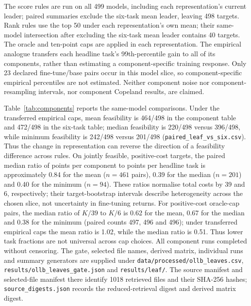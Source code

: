 \documentclass{article}
\begin{document}
The score rules are run on all 499 models, including each representation's current leader; paired summaries exclude the six-task mean leader, leaving 498 targets. Rank rules use the top 50 under each representation's own mean; their same-model intersection after excluding the six-task mean leader contains 40 targets. The oracle and ten-point caps are applied in each representation. The empirical analogue transfers each headline task's 99th-percentile gain to all of its components, rather than estimating a component-specific training response. Only 23 declared fine-tune/base pairs occur in this model slice, so component-specific empirical percentiles are not estimated. Neither component noise nor component-resampling intervals, nor component Copeland results, are claimed.

Table~\ref{tab:components} reports the same-model comparisons. Under the transferred empirical caps, mean feasibility is 464/498 in the component table and 472/498 in the six-task table; median feasibility is 220/498 versus 396/498, while minimum feasibility is 242/498 versus 201/498 (\texttt{paired\_leaf\_vs\_six.csv}). Thus the change in representation can reverse the direction of a feasibility difference across rules. On jointly feasible, positive-cost targets, the paired median ratio of points per component to points per headline task is approximately 0.84 for the mean ($n=461$ pairs), 0.39 for the median ($n=201$) and 0.40 for the minimum ($n=94$). These ratios normalise total costs by 39 and 6, respectively; their target-bootstrap intervals describe heterogeneity across the chosen slice, not uncertainty in fine-tuning returns. For positive-cost oracle-cap pairs, the median ratio of $K/39$ to $K/6$ is 0.62 for the mean, 0.67 for the median and 0.38 for the minimum (paired counts 497, 496 and 496); under transferred empirical caps the mean ratio is 1.02, while the median ratio is 0.51. Thus lower task fractions are not universal across cap choices. All component runs completed without censoring. The gate, selected file names, derived matrix, individual runs and summary generators are supplied under \texttt{data/processed/ollb\_leaves.csv}, \texttt{results/ollb\_leaves\_gate.json} and \texttt{results/leaf/}. The source manifest and selected-file manifest there identify 1018 retrieved files and their SHA-256 hashes; \texttt{source\_digests.json} records the reduced-retrieval digest and derived matrix digest.
\end{document}
